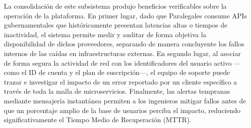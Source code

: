 La consolidación de este subsistema produjo beneficios verificables sobre la operación de la plataforma. En primer lugar, dado que Paralegales consume APIs gubernamentales que históricamente presentan latencias altas o tiempos de inactividad, el sistema permite medir y auditar de forma objetiva la disponibilidad de dichos proveedores, separando de manera concluyente los fallos internos de las caídas en infraestructuras externas. En segundo lugar, al asociar de forma segura la actividad de red con los identificadores del usuario activo —como el ID de cuenta y el plan de suscripción—, el equipo de soporte puede trazar e investigar el impacto de un error reportado por un cliente específico a través de toda la malla de microservicios. Finalmente, las alertas tempranas mediante mensajería instantánea permiten a los ingenieros mitigar fallos antes de que un porcentaje amplio de la base de usuarios perciba el impacto, reduciendo significativamente el Tiempo Medio de Recuperación (MTTR).
